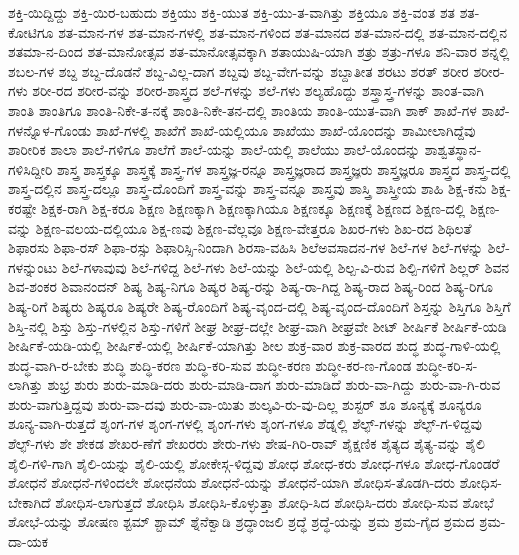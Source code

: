 {ಶಕ್ತಿ-ಯಿದ್ದಿದ್ದು
ಶಕ್ತಿ-ಯಿರ-ಬಹುದು
ಶಕ್ತಿಯು
ಶಕ್ತಿ-ಯುತ
ಶಕ್ತಿ-ಯು-ತ-ವಾಗಿತ್ತು
ಶಕ್ತಿಯೂ
ಶಕ್ತಿ-ವಂತ
ಶತ
ಶತ-ಕೋಟಿಗೂ
ಶತ-ಮಾನ-ಗಳ
ಶತ-ಮಾನ-ಗಳಲ್ಲಿ
ಶತ-ಮಾನ-ಗಳಿಂದ
ಶತ-ಮಾನದ
ಶತ-ಮಾನ-ದಲ್ಲಿ
ಶತ-ಮಾನ-ದಲ್ಲಿನ
ಶತಮಾ-ನ-ದಿಂದ
ಶತ-ಮಾನೋತ್ಸವ
ಶತ-ಮಾನೋತ್ಸವಕ್ಕಾಗಿ
ಶತಾಯುಷಿ-ಯಾಗಿ
ಶತ್ರು
ಶತ್ರು-ಗಳೂ
ಶನಿ-ವಾರ
ಶನ್ನಲ್ಲಿ
ಶಬಲ-ಗಳ
ಶಬ್ದ
ಶಬ್ದ-ದೊಡನೆ
ಶಬ್ದ-ವಿಲ್ಲ-ದಾಗ
ಶಬ್ದವು
ಶಬ್ದ-ವೇಗ-ವನ್ನು
ಶಬ್ದಾತೀತ
ಶರಟು
ಶರತ್
ಶರೀರ
ಶರೀರ-ಗಳು
ಶರೀ-ರದ
ಶರೀರ-ವನ್ನು
ಶರೀರ-ಶಾಸ್ತ್ರದ
ಶಲೆ-ಗಳನ್ನು
ಶಲೆ-ಗಳು
ಶಲ್ಯಹೊದ್ದು
ಶಸ್ತ್ರಾಸ್ತ್ರ-ಗಳನ್ನು
ಶಾಂತ-ವಾಗಿ
ಶಾಂತಿ
ಶಾಂತಿಗೂ
ಶಾಂತಿ-ನಿಕೇ-ತ-ನಕ್ಕೆ
ಶಾಂತಿ-ನಿಕೇ-ತನ-ದಲ್ಲಿ
ಶಾಂತಿಯ
ಶಾಂತಿ-ಯುತ-ವಾಗಿ
ಶಾಕ್
ಶಾಖೆ-ಗಳ
ಶಾಖೆ-ಗಳನ್ನೊಳ-ಗೊಂಡು
ಶಾಖೆ-ಗಳಲ್ಲಿ
ಶಾಖೆಗೆ
ಶಾಖೆ-ಯಲ್ಲಿಯೂ
ಶಾಖೆಯು
ಶಾಖೆ-ಯೊಂದನ್ನು
ಶಾಮೀಲಾಗಿದ್ದೆವು
ಶಾರೀರಿಕ
ಶಾಲಾ
ಶಾಲೆ-ಗಳಿಗೂ
ಶಾಲೆಗೆ
ಶಾಲೆ-ಯನ್ನು
ಶಾಲೆ-ಯಲ್ಲಿ
ಶಾಲೆಯು
ಶಾಲೆ-ಯೊಂದನ್ನು
ಶಾಶ್ವತಸ್ಥಾನ-ಗಳಿಸಿದ್ದೀರಿ
ಶಾಸ್ತ್ರ
ಶಾಸ್ತ್ರಕ್ಕೂ
ಶಾಸ್ತ್ರಕ್ಕೆ
ಶಾಸ್ತ್ರ-ಗಳ
ಶಾಸ್ತ್ರಜ್ಞ-ರನ್ನೂ
ಶಾಸ್ತ್ರಜ್ಞರಾದ
ಶಾಸ್ತ್ರಜ್ಞರು
ಶಾಸ್ತ್ರಜ್ಞರೂ
ಶಾಸ್ತ್ರದ
ಶಾಸ್ತ್ರ-ದಲ್ಲಿ
ಶಾಸ್ತ್ರ-ದಲ್ಲಿನ
ಶಾಸ್ತ್ರ-ದಲ್ಲೂ
ಶಾಸ್ತ್ರ-ದೊಂದಿಗೆ
ಶಾಸ್ತ್ರ-ವನ್ನು
ಶಾಸ್ತ್ರ-ವನ್ನೂ
ಶಾಸ್ತ್ರವು
ಶಾಸ್ತ್ರಿ
ಶಾಸ್ತ್ರೀಯ
ಶಾಹಿ
ಶಿಕ್ಷ-ಕನು
ಶಿಕ್ಷ-ಕರಷ್ಟೇ
ಶಿಕ್ಷಕ-ರಾಗಿ
ಶಿಕ್ಷ-ಕರೂ
ಶಿಕ್ಷಣ
ಶಿಕ್ಷಣಕ್ಕಾಗಿ
ಶಿಕ್ಷಣಕ್ಕಾಗಿಯೂ
ಶಿಕ್ಷಣಕ್ಕೂ
ಶಿಕ್ಷಣಕ್ಕೆ
ಶಿಕ್ಷಣದ
ಶಿಕ್ಷಣ-ದಲ್ಲಿ
ಶಿಕ್ಷಣ-ವನ್ನು
ಶಿಕ್ಷಣ-ವಲಯ-ದಲ್ಲಿಯೂ
ಶಿಕ್ಷ-ಣವು
ಶಿಕ್ಷಣ-ವೆಲ್ಲವೂ
ಶಿಕ್ಷಣ-ವೇತ್ತರೂ
ಶಿಖರ-ಗಳು
ಶಿಖ-ರದ
ಶಿಥಿಲತೆ
ಶಿಫಾರಸು
ಶಿಫಾ-ರಸ್
ಶಿಫಾ-ರಸ್ಸು
ಶಿಫಾರಿಸ್ಸಿ-ನಿಂದಾಗಿ
ಶಿರಸಾ-ವಹಿಸಿ
ಶಿಲೆಅವಸಾದನ-ಗಳ
ಶಿಲೆ-ಗಳ
ಶಿಲೆ-ಗಳನ್ನು
ಶಿಲೆ-ಗಳನ್ನುಂಟು
ಶಿಲೆ-ಗಳಾವುವು
ಶಿಲೆ-ಗಳಿದ್ದ
ಶಿಲೆ-ಗಳು
ಶಿಲೆ-ಯನ್ನು
ಶಿಲೆ-ಯಲ್ಲಿ
ಶಿಲ್ಪ-ವಿ-ರುವ
ಶಿಲ್ಪಿ-ಗಳಿಗೆ
ಶಿಲ್ಲರ್
ಶಿವನ
ಶಿವ-ಶಂಕರ
ಶಿವಾನಂದನ್
ಶಿಷ್ಯ
ಶಿಷ್ಯ-ನಿಗೂ
ಶಿಷ್ಯರ
ಶಿಷ್ಯ-ರನ್ನು
ಶಿಷ್ಯ-ರಾ-ಗಿದ್ದ
ಶಿಷ್ಯ-ರಾದ
ಶಿಷ್ಯ-ರಿಂದ
ಶಿಷ್ಯ-ರಿಗೂ
ಶಿಷ್ಯ-ರಿಗೆ
ಶಿಷ್ಯರು
ಶಿಷ್ಯರೂ
ಶಿಷ್ಯರೇ
ಶಿಷ್ಯ-ರೊಂದಿಗೆ
ಶಿಷ್ಯ-ವೃಂದ-ದಲ್ಲಿ
ಶಿಷ್ಯ-ವೃಂದ-ದೊಂದಿಗೆ
ಶಿಸ್ತನ್ನು
ಶಿಸ್ತಿಗೂ
ಶಿಸ್ತಿಗೆ
ಶಿಸ್ತಿ-ನಲ್ಲಿ
ಶಿಸ್ತು
ಶಿಸ್ತು-ಗಳಲ್ಲಿನ
ಶಿಸ್ತು-ಗಳಿಗೆ
ಶೀಘ್ರ
ಶೀಘ್ರ-ದಲ್ಲೇ
ಶೀಘ್ರ-ವಾಗಿ
ಶೀಘ್ರವೇ
ಶೀಟ್
ಶೀರ್ಷಿಕೆ
ಶೀರ್ಷಿಕೆ-ಯಡಿ
ಶೀರ್ಷಿಕೆ-ಯಡಿ-ಯಲ್ಲಿ
ಶೀರ್ಷಿಕೆ-ಯಲ್ಲಿ
ಶೀರ್ಷಿಕೆ-ಯಾಗಿತ್ತು
ಶೀಲ
ಶುಕ್ರ-ವಾರ
ಶುಕ್ರ-ವಾರದ
ಶುದ್ಧ
ಶುದ್ಧ-ಗಾಳಿ-ಯಲ್ಲಿ
ಶುದ್ಧ-ವಾಗಿ-ರ-ಬೇಕು
ಶುದ್ಧಿ
ಶುದ್ಧಿ-ಕರಣ
ಶುದ್ಧಿ-ಕರಿ-ಸುವ
ಶುದ್ಧೀ-ಕರಣ
ಶುದ್ಧೀ-ಕರ-ಣ-ಗೊಂಡ
ಶುದ್ಧೀ-ಕರಿ-ಸ-ಲಾಗಿತ್ತು
ಶುಭ್ರ
ಶುರು
ಶುರು-ಮಾಡಿ-ದರು
ಶುರು-ಮಾಡಿ-ದಾಗ
ಶುರು-ಮಾಡಿದೆ
ಶುರು-ವಾ-ಗಿದ್ದು
ಶುರು-ವಾ-ಗಿ-ರುವ
ಶುರು-ವಾಗುತ್ತಿದ್ದವು
ಶುರು-ವಾ-ದವು
ಶುರು-ವಾ-ಯಿತು
ಶುಲ್ಕವಿ-ರು-ವು-ದಿಲ್ಲ
ಶುಸ್ಟರ್
ಶೂ
ಶೂನ್ಯಕ್ಕೆ
ಶೂನ್ಯರೂ
ಶೂನ್ಯ-ವಾಗಿ-ರುತ್ತದೆ
ಶೃಂಗ-ಗಳ
ಶೃಂಗ-ಗಳಲ್ಲಿ
ಶೃಂಗ-ಗಳು
ಶೃಂಗ-ಗಳೂ
ಶೆಡ್ನಲ್ಲಿ
ಶೆಲ್ಫ್-ಗಳನ್ನು
ಶೆಲ್ಫ್-ಗ-ಳಿದ್ದವು
ಶೆಲ್ಫ್-ಗಳು
ಶೇ
ಶೇಕಡ
ಶೇಖರ-ಣೆಗೆ
ಶೇಖರರು
ಶೇರು-ಗಳು
ಶೇಷ-ಗಿರಿ-ರಾವ್
ಶೈಕ್ಷಣಿಕ
ಶೈತ್ಯದ
ಶೈತ್ಯ-ವನ್ನು
ಶೈಲಿ
ಶೈಲಿ-ಗಳಿ-ಗಾಗಿ
ಶೈಲಿ-ಯನ್ನು
ಶೈಲಿ-ಯಲ್ಲಿ
ಶೋಕೇಸ್ಗ-ಳಿದ್ದವು
ಶೋಧ
ಶೋಧ-ಕರು
ಶೋಧ-ಗಳೂ
ಶೋಧ-ಗೊಂಡರೆ
ಶೋಧನೆ
ಶೋಧನೆ-ಗಳಿಂದಲೇ
ಶೋಧನೆಯ
ಶೋಧನೆ-ಯನ್ನು
ಶೋಧನೆ-ಯಾಗಿ
ಶೋಧಿಸ-ತೊಡಗಿ-ದರು
ಶೋಧಿಸ-ಬೇಕಾಗಿದೆ
ಶೋಧಿಸ-ಲಾಗುತ್ತದೆ
ಶೋಧಿಸಿ
ಶೋಧಿಸಿ-ಕೊಳ್ಳುತ್ತಾ
ಶೋಧಿ-ಸಿದ
ಶೋಧಿಸಿ-ದರು
ಶೋಧಿ-ಸುವ
ಶೋಭೆ
ಶೋಭೆ-ಯನ್ನು
ಶೋಷಣ
ಶ್ಟಮ್
ಶ್ಟಾಮ್
ಶ್ನೆನೆಕ್ವಾಡಿ
ಶ್ರದ್ಧಾಂಜಲಿ
ಶ್ರದ್ಧೆ
ಶ್ರದ್ಧೆ-ಯನ್ನು
ಶ್ರಮ
ಶ್ರಮ-ಗೈದ
ಶ್ರಮದ
ಶ್ರಮ-ದಾ-ಯಕ
}
